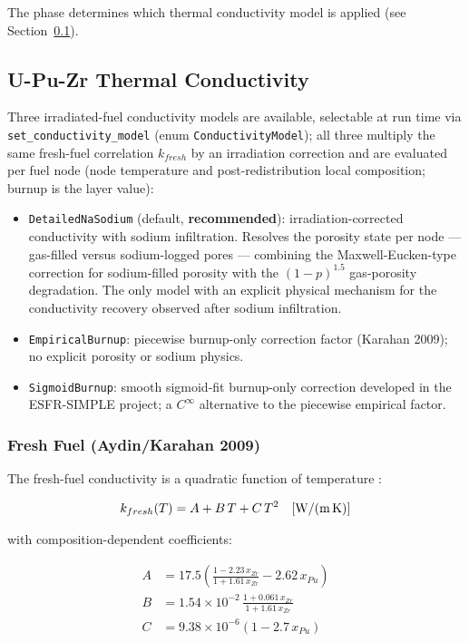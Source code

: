 \begin{refsection}
The phase determines which thermal conductivity model is applied (see Section~\ref{sec:upuzr_k}).

\subsection{U-Pu-Zr Thermal Conductivity}
\label{sec:upuzr_k}

Three irradiated-fuel conductivity models are available, selectable at run time via \texttt{set\_conductivity\_model} (enum \texttt{ConductivityModel}); all three multiply the same fresh-fuel correlation $k_{fresh}$ by an irradiation correction and are evaluated per fuel node (node temperature and post-redistribution local composition; burnup is the layer value):

\begin{itemize}
\item \texttt{DetailedNaSodium} (default, \textbf{recommended}): irradiation-corrected conductivity with sodium infiltration.  Resolves the porosity state per node --- gas-filled versus sodium-logged pores --- combining the Maxwell-Eucken-type correction for sodium-filled porosity with the $(1-p)^{1.5}$ gas-porosity degradation.  The only model with an explicit physical mechanism for the conductivity recovery observed after sodium infiltration.
\item \texttt{EmpiricalBurnup}: piecewise burnup-only correction factor (Karahan 2009); no explicit porosity or sodium physics.
\item \texttt{SigmoidBurnup}: smooth sigmoid-fit burnup-only correction developed in the ESFR-SIMPLE project; a $C^\infty$ alternative to the piecewise empirical factor.
\end{itemize}

\subsubsection{Fresh Fuel (Aydin/Karahan 2009)}

The fresh-fuel conductivity is a quadratic function of temperature \cite{karahan2009}:

\begin{equation}
  k_{fresh}(T) = A + B\,T + C\,T^2 \quad \text{[W/(m\,K)]}
  \label{eq:k_upuzr}
\end{equation}

with composition-dependent coefficients:

\begin{align}
  A &= 17.5\left(\frac{1 - 2.23\,x_{Zr}}{1 + 1.61\,x_{Zr}} - 2.62\,x_{Pu}\right) \\
  B &= 1.54\times10^{-2}\,\frac{1 + 0.061\,x_{Zr}}{1 + 1.61\,x_{Zr}} \\
  C &= 9.38\times10^{-6}(1 - 2.7\,x_{Pu})
\end{align}


\end{refsection}
